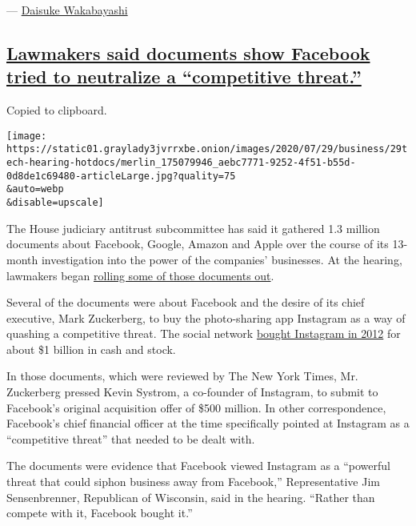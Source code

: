 ---
\href{https://www.nytimes3xbfgragh.onion/by/daisuke-wakabayashi}{Daisuke
Wakabayashi}

\hypertarget{lawmakers-said-documents-show-facebook-tried-to-neutralize-a-competitive-threat}{%
\subsection{\texorpdfstring{\protect\hyperlink{lawmakers-said-documents-show-facebook-tried-to-neutralize-a-competitive-threat}{Lawmakers
said documents show Facebook tried to neutralize a ``competitive
threat.''}}{Lawmakers said documents show Facebook tried to neutralize a ``competitive threat.''}}\label{lawmakers-said-documents-show-facebook-tried-to-neutralize-a-competitive-threat}}

Copied to clipboard.

\texttt{[image: https://static01.graylady3jvrrxbe.onion/images/2020/07/29/business/29tech-hearing-hotdocs/merlin\_175079946\_aebc7771-9252-4f51-b55d-0d8de1c69480-articleLarge.jpg?quality=75\\\&auto=webp\\\&disable=upscale]}

The House judiciary antitrust subcommittee has said it gathered 1.3
million documents about Facebook, Google, Amazon and Apple over the
course of its 13-month investigation into the power of the companies'
businesses. At the hearing, lawmakers began
\href{https://twitter.com/HouseJudiciary/status/1288540745637474306?s=20}{rolling
some of those documents out}.

Several of the documents were about Facebook and the desire of its chief
executive, Mark Zuckerberg, to buy the photo-sharing app Instagram as a
way of quashing a competitive threat. The social network
\href{https://dealbook.nytimes3xbfgragh.onion/2012/04/09/facebook-buys-instagram-for-1-billion/\#:~:text=Facebook\%20is\%20not\%20waiting\%20for,stock\%2C\%20the\%20company\%20said\%20Monday.}{bought
Instagram in 2012} for about \$1 billion in cash and stock.

In those documents, which were reviewed by The New York Times, Mr.
Zuckerberg pressed Kevin Systrom, a co-founder of Instagram, to submit
to Facebook's original acquisition offer of \$500 million. In other
correspondence, Facebook's chief financial officer at the time
specifically pointed at Instagram as a ``competitive threat'' that
needed to be dealt with.

The documents were evidence that Facebook viewed Instagram as a
``powerful threat that could siphon business away from Facebook,''
Representative Jim Sensenbrenner, Republican of Wisconsin, said in the
hearing. ``Rather than compete with it, Facebook bought it.''


